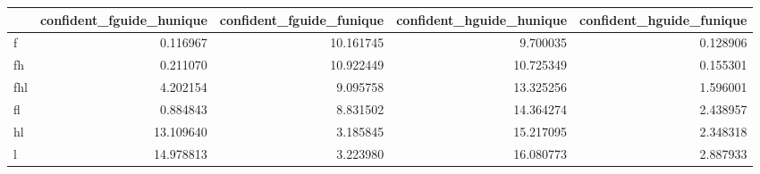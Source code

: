 \begin{tabular}{lrrrr}
\toprule
 & confident_fguide_hunique & confident_fguide_funique & confident_hguide_hunique & confident_hguide_funique \\
\midrule
f & 0.116967 & 10.161745 & 9.700035 & 0.128906 \\
fh & 0.211070 & 10.922449 & 10.725349 & 0.155301 \\
fhl & 4.202154 & 9.095758 & 13.325256 & 1.596001 \\
fl & 0.884843 & 8.831502 & 14.364274 & 2.438957 \\
hl & 13.109640 & 3.185845 & 15.217095 & 2.348318 \\
l & 14.978813 & 3.223980 & 16.080773 & 2.887933 \\
\bottomrule
\end{tabular}
